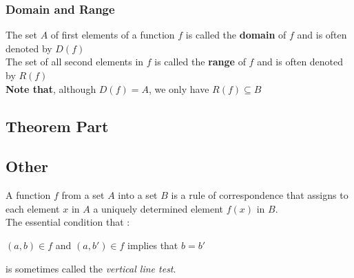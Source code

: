 \documentclass{article}
\begin{document}
            \subsubsection{Domain and Range}
                The set $A$ of first elements of a function $f$ is called the \textbf{domain} of $f$ and is often denoted by $D(f)$
                \\
                The set of all second elements in $f$ is called the \textbf{range} of $f$ and is often denoted by $R(f)$
                \\
                \textbf{Note that}, although $D(f)=A$, we only have $R(f)\subseteq B$
        \subsection{Theorem Part}

        \subsection{Other}
        A function $f$ from a set $A$ into a set $B$ is a rule of correspondence that assigns to each element $x$ in $A$ a uniquely determined element $f(x)$ in $B$.
        \\
        The essential condition that :
        \begin{center}
            $(a,b)\in f$ and $(a,b')\in f$ implies that $b=b'$
        \end{center}
        is sometimes called the \textit{vertical line test}.
\end{document}

